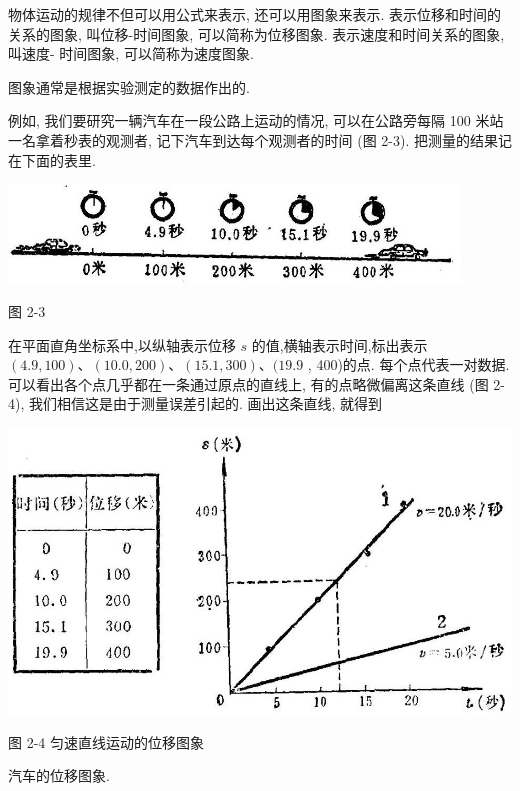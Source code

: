 \documentclass[10pt]{article}
\begin{document}
物体运动的规律不但可以用公式来表示, 还可以用图象来表示. 表示位移和时间的关系的图象, 叫位移-时间图象, 可以简称为位移图象. 表示速度和时间关系的图象, 叫速度- 时间图象, 可以简称为速度图象.

图象通常是根据实验测定的数据作出的.

例如, 我们要研究一辆汽车在一段公路上运动的情况, 可以在公路旁每隔 100 米站一名拿着秒表的观测者, 记下汽车到达每个观测者的时间 (图 2-3). 把测量的结果记在下面的表里.

\begin{center}
\includegraphics[max width=0.9\textwidth]{images/01912d55-147c-70aa-b0e0-1782a122f948_60_988298.jpg}
\end{center}

图 2-3

在平面直角坐标系中,以纵轴表示位移 \(s\) 的值,横轴表示时间,标出表示 \(\left( {{4.9},{100}}\right) \text{、}\left( {{10.0},{200}}\right) \text{、}\left( {{15.1},{300}}\right) \text{、}({19.9}\) , 400)的点. 每个点代表一对数据. 可以看出各个点几乎都在一条通过原点的直线上, 有的点略微偏离这条直线 (图 2-4), 我们相信这是由于测量误差引起的. 画出这条直线, 就得到

\begin{center}
\includegraphics[max width=1.0\textwidth]{images/01912d55-147c-70aa-b0e0-1782a122f948_61_851196.jpg}
\end{center}

图 2-4 匀速直线运动的位移图象

汽车的位移图象.
\end{document}
